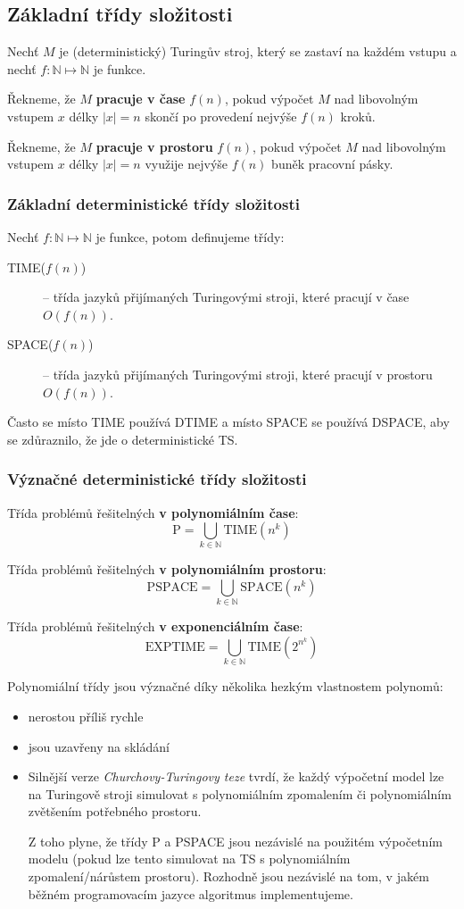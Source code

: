 \documentclass[11pt]{report} %
\newcommand{\N}{\mathbb{N}}
\begin{document}
\subsection{Základní třídy složitosti}
Nechť $M$ je (deterministický) Turingův stroj, který se zastaví na každém vstupu a nechť $f : \N \mapsto \N$ je funkce.

Řekneme, že $M$ \textbf{pracuje v čase} $f(n)$, pokud výpočet $M$ nad libovolným vstupem $x$ délky $|x| = n$ skončí po provedení nejvýše $f(n)$ kroků.

Řekneme, že $M$ \textbf{pracuje v prostoru} $f(n)$, pokud výpočet $M$ nad libovolným vstupem $x$ délky $|x| = n$ využije nejvýše $f(n)$ buněk pracovní pásky.

\subsubsection{Základní deterministické třídy složitosti}
Nechť $f : \N \mapsto \N$ je funkce, potom definujeme třídy:
\begin{description}
	\item[TIME($f(n)$)] – třída jazyků přijímaných Turingovými stroji, které pracují v čase $O(f(n))$.
	\item[SPACE($f(n)$)] – třída jazyků přijímaných Turingovými stroji, které pracují v prostoru $O(f(n))$.	
\end{description}
Často se místo TIME používá DTIME a místo SPACE se používá DSPACE, aby se zdůraznilo, že jde o deterministické TS.

\subsubsection{Význačné deterministické třídy složitosti}
Třída problémů řešitelných \textbf{v polynomiálním čase}:
$$\text{P} = \bigcup_{k\in\N} \text{TIME}(n^k)$$

Třída problémů řešitelných \textbf{v polynomiálním prostoru}:
$$\text{PSPACE} = \bigcup_{k\in\N} \text{SPACE}(n^k)$$

Třída problémů řešitelných \textbf{v exponenciálním čase}:
$$\text{EXPTIME} = \bigcup_{k\in\N} \text{TIME}(2^{n^k})$$

Polynomiální třídy jsou význačné díky několika hezkým vlastnostem polynomů:
\begin{itemize}
	\leftskip 20pt
	\setlength{\itemsep}{0pt}
	\item nerostou příliš rychle
	\item jsou uzavřeny na skládání
	\item Silnější verze \textit{Churchovy-Turingovy teze} tvrdí, že každý  výpočetní
	model lze na Turingově stroji simulovat s polynomiálním zpomalením či polynomiálním zvětšením potřebného prostoru. 
	
	Z toho plyne, že třídy P a PSPACE jsou nezávislé na použitém výpočetním modelu (pokud lze tento simulovat na TS s polynomiálním zpomalení/nárůstem prostoru). Rozhodně jsou nezávislé na tom, v jakém běžném programovacím jazyce algoritmus implementujeme. 
\end{itemize}
\end{document}
